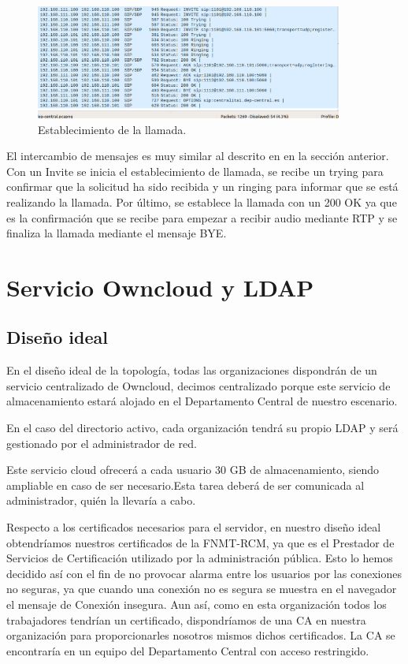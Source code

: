 \documentclass[a4paper]{article}
\begin{document}
\begin{figure}[htb]
    \begin{center}
        \includegraphics[width=0.9\textwidth]{invite1112-1101.png}
        \caption{Establecimiento de la llamada.}
         \label{fig:aut2}
    \end{center}
\end{figure}

El intercambio de mensajes es muy similar al descrito en en la sección anterior. Con un Invite se inicia el establecimiento de llamada, se recibe un trying para confirmar que la solicitud ha sido recibida y un ringing para informar que se está realizando la llamada. Por último, se establece la llamada con un 200 OK ya que es la confirmación que se recibe para empezar a recibir audio mediante RTP y se finaliza la llamada mediante el mensaje BYE.

\newpage

\section{Servicio Owncloud y LDAP}
\subsection{Diseño ideal}
En el diseño ideal de la topología, todas las organizaciones dispondrán de un servicio centralizado de Owncloud, decimos centralizado porque este servicio de almacenamiento estará alojado en el Departamento Central de nuestro escenario.

En el caso del directorio activo, cada organización tendrá su propio LDAP y será gestionado por el administrador de red.

Este servicio cloud ofrecerá a cada usuario 30 GB de almacenamiento, siendo
ampliable en caso de ser necesario.Esta tarea deberá de ser comunicada al administrador,
quién la llevaría a cabo.

Respecto a los certificados necesarios para el servidor, en nuestro diseño ideal
obtendríamos nuestros certificados de la FNMT-RCM, ya que es el Prestador de Servicios de Certificación utilizado por la administración pública. Esto lo hemos decidido así con el fin de no provocar alarma entre los usuarios por las conexiones no seguras, ya que cuando una conexión no es segura se muestra en el navegador el mensaje de Conexión insegura. Aun así, como en
esta organización todos los trabajadores tendrían un certificado,  dispondríamos de una CA en nuestra organización para proporcionarles nosotros mismos dichos certificados. La CA se encontraría en un equipo del Departamento Central con acceso restringido.
\end{document}
